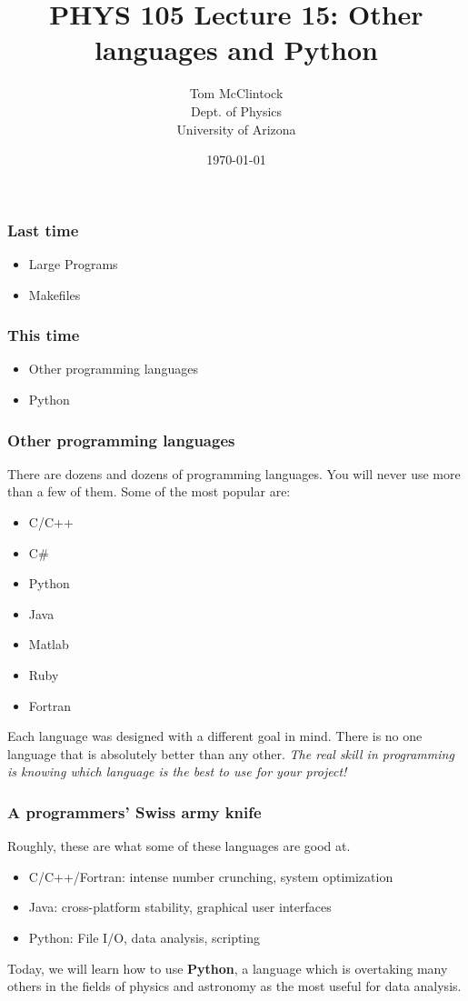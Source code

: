 \documentclass{beamer}
\title{PHYS 105 Lecture 15: Other languages and Python}
\author{Tom McClintock \\
	Dept. of Physics\\
	University of Arizona
}
\date{\today}
\begin{document}
\begin{frame}
  \titlepage
\end{frame}

\begin{frame}
  \frametitle{Last time}
  \begin{itemize}
  \item Large Programs
  \item Makefiles
  \end{itemize}
\end{frame}

\begin{frame}
  \frametitle{This time}
  \begin{itemize}
  \item Other programming languages
  \item Python
  \end{itemize}
\end{frame}

\begin{frame}
  \frametitle{Other programming languages}
  There are dozens and dozens of programming languages. You will never use
  more than a few of them. Some of the most popular are:
  \begin{itemize}
  \item C/C++
  \item C\#
  \item Python
  \item Java
  \item Matlab
  \item Ruby
  \item Fortran
  \end{itemize}
  Each language was designed with a different goal in mind. There is no
  one language that is absolutely better than any other. 
  \textit{The real skill in programming is knowing which language is the best to use for your project!}
\end{frame}

\begin{frame}
  \frametitle{A programmers' Swiss army knife}
  Roughly, these are what some of these languages are good at.
  \begin{itemize}
  \item C/C++/Fortran: intense number crunching, system optimization
  \item Java: cross-platform stability, graphical user interfaces
  \item Python: File I/O, data analysis, scripting
  \end{itemize}
  Today, we will learn how to use \textbf{Python}, a language which is
  overtaking many others in the fields of physics and astronomy as
  the most useful for data analysis.
\end{frame}
\end{document}
